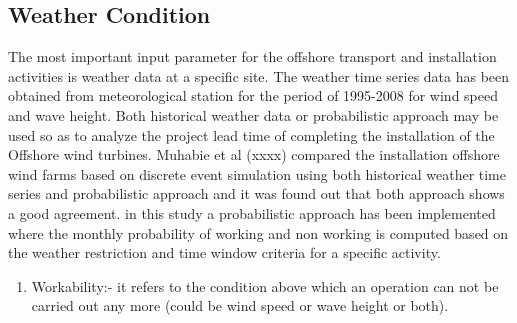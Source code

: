 \subsection{Weather Condition}

The most important input parameter for the offshore transport and installation activities is weather data at a specific site. The weather time series data has been obtained from meteorological station for the period of 1995-2008 for wind speed and wave height. Both historical weather data or probabilistic approach may be used so as to  analyze the project lead time of completing the installation of the Offshore wind turbines. Muhabie et al (xxxx) compared the installation offshore wind farms based on discrete event simulation using both historical weather time series and probabilistic approach  and it was found out that both approach shows a good agreement. in this study a probabilistic approach has been implemented where the monthly probability of working and non working is computed based on the weather restriction and time window criteria for a specific activity. 
\begin{enumerate}
\item
Workability:- it refers to the condition above which an operation can not be carried out any more (could be wind speed or wave height or both).
\end{enumerate}
